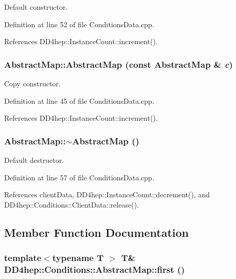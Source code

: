 Default constructor. 

Definition at line 52 of file ConditionsData.cpp.

References DD4hep::InstanceCount::increment().\hypertarget{class_d_d4hep_1_1_conditions_1_1_abstract_map_a0792cc7e113b71a15f238b363b95816d}{
\subsubsection[{AbstractMap}]{\setlength{\rightskip}{0pt plus 5cm}AbstractMap::AbstractMap (const {\bf AbstractMap} \& {\em c})}}
\label{class_d_d4hep_1_1_conditions_1_1_abstract_map_a0792cc7e113b71a15f238b363b95816d}


Copy constructor. 

Definition at line 45 of file ConditionsData.cpp.

References DD4hep::InstanceCount::increment().\hypertarget{class_d_d4hep_1_1_conditions_1_1_abstract_map_ab2fbb46108e2905fb1193a67510d41f0}{
\subsubsection[{$\sim$AbstractMap}]{\setlength{\rightskip}{0pt plus 5cm}AbstractMap::$\sim$AbstractMap ()}}
\label{class_d_d4hep_1_1_conditions_1_1_abstract_map_ab2fbb46108e2905fb1193a67510d41f0}


Default destructor. 

Definition at line 57 of file ConditionsData.cpp.

References clientData, DD4hep::InstanceCount::decrement(), and DD4hep::Conditions::ClientData::release().

\subsection{Member Function Documentation}
\hypertarget{class_d_d4hep_1_1_conditions_1_1_abstract_map_a555bae85a354a06df73d72eaf248fd80}{
\subsubsection[{first}]{\setlength{\rightskip}{0pt plus 5cm}template$<$typename T $>$ {\bf T}\& DD4hep::Conditions::AbstractMap::first ()}}
\label{class_d_d4hep_1_1_conditions_1_1_abstract_map_a555bae85a354a06df73d72eaf248fd80}


